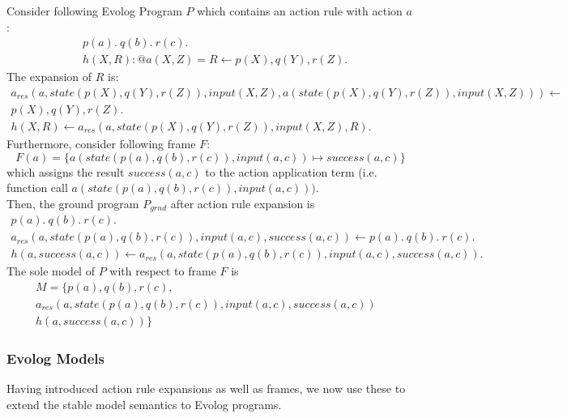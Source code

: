 \begin{example}
\label{ex:action-rule-expansion}
Consider following Evolog Program $P$ which contains an action rule with action $a$:
\begin{align*}
	&p(a).~q(b).~r(c). \\
	&h(X, R) : @a(X, Z) = R \leftarrow p(X), q(Y), r(Z).
\end{align*}
The expansion of $R$ is:
\begin{align*}
	a_{res}(a, \mathit{state}(p(X), q(Y), r(Z)), \mathit{input}(X, Z), a(\mathit{state}(p(X), q(Y), r(Z)), \mathit{input}(X, Z))) \leftarrow& \\
	p(X), q(Y), r(Z).& \\
	h(X, R) \leftarrow a_{res}(a, \mathit{state}(p(X), q(Y), r(Z)), \mathit{input}(X, Z), R).&
\end{align*}
Furthermore, consider following frame $F$:
\[
	F(a) = \{a(\mathit{state}(p(a), q(b), r(c)), \mathit{input}(a, c)) \mapsto \mathit{success}(a, c)\}
\]
which assigns the result $\mathit{success}(a, c)$ to the action application term (i.e. function call $a(\mathit{state}(p(a), q(b), r(c)), \mathit{input}(a, c)))$. \\

Then, the ground program $P_{grnd}$ after action rule expansion is
\begin{align*}
	p(a).~q(b).~r(c).& \\
	a_{res}(a, \mathit{state}(p(a), q(b), r(c)), \mathit{input}(a, c), \mathit{success}(a, c)) \leftarrow p(a).~q(b).~r(c).& \\
	h(a, \mathit{success}(a, c)) \leftarrow a_{res}(a, \mathit{state}(p(a), q(b), r(c)), \mathit{input}(a, c), \mathit{success}(a, c)).&
\end{align*}
The sole model of $P$ with respect to frame $F$ is 
\begin{align*}
	M = \{p(a), q(b), r(c),& \\
	a_{res}(a, \mathit{state}(p(a), q(b), r(c)), \mathit{input}(a, c), \mathit{success}(a, c))& \\ h(a, \mathit{success}(a, c))\}&
\end{align*}
\end{example}

\subsubsection{Evolog Models}
\label{subsubsec:evolog-action-semantics-models}

Having introduced action rule expansions as well as frames, we now use these to extend the stable model semantics to Evolog programs.

